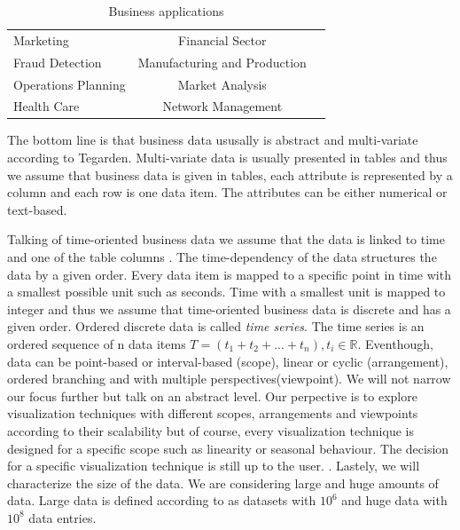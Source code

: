 \begin{table}[th]
	\centering
	\caption[Table 1]{Business applications\cite{Brachman1996,Tegarden1999}}
	\label{businessapplications}
	\begin{tabu}{lcc}
	\toprule
	Marketing & Financial Sector \\
	Fraud Detection & Manufacturing and Production \\
	Operations Planning & Market Analysis \\
	Health Care & Network Management\\
	\bottomrule
	\end{tabu}
\end{table}

The bottom line is that business data ususally is abstract and multi-variate according to Tegarden\cite{tegarden1999}. Multi-variate data is usually presented in tables\cite{Borgo2013} and thus we assume that business data is given in tables, each attribute is represented by a column and each row is one data item. The attributes can be either numerical or text-based. 

Talking of time-oriented business data we assume that the data is linked to time and one of the table columns . The time-dependency of the data structures the data by a given order. Every data item is mapped to a specific point in time with a smallest possible unit such as seconds. Time with a smallest unit is mapped to integer\cite{Aigner2011} and thus we assume that time-oriented business data is discrete and has a given order. Ordered discrete data is called \textit{time series}. The time series is an ordered sequence of n data items $T=(t_1+t_2+...+t_n),t_i\in\mathbb{R}$. Eventhough, data can be point-based or interval-based (scope), linear or cyclic (arrangement), ordered branching and with multiple perspectives(viewpoint)\cite{Aigner2011}. We will not narrow our focus further but talk on an abstract level. Our perpective is to explore visualization techniques with different scopes, arrangements and viewpoints according to their scalability but of course, every visualization technique is designed for a specific scope such as linearity or seasonal behaviour. The decision for a specific visualization technique is still up to the user. .
Lastely, we will characterize the size of the data. We are considering large and huge amounts of data. Large data is defined according to\cite{Huber1994} as datasets with $10^6$ and huge data with $10^8$ data entries.




